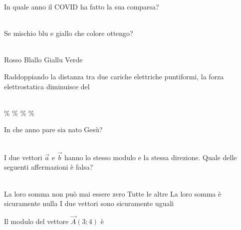\documentclass[a4paper,11pt]{exam}
\begin{document}
    
    \newpage
    
    

        \begin{center} 
        \end{center}
\begin{questions}

    
\question In quale anno il COVID ha fatto la sua comparsa?\\\
\begin{oneparchoices}
\end{oneparchoices}

    
\question Se mischio blu e giallo che colore ottengo?\\\
\begin{oneparchoices}
  \choice Rosso
  \choice Blallo
  \choice Giallu
  \choice Verde
\end{oneparchoices}

    
\question Raddoppiando la distanza tra due cariche elettriche puntiformi, la forza elettrostatica diminuisce del\\\
\begin{oneparchoices}
  \choice 90\%
  \choice 25\%
  \%
  \%
\end{oneparchoices}

    
\question In che anno pare sia nato Gesù?\\\
\begin{oneparchoices}
  19
  \choice 0
  \choice -80
  \choice 20
\end{oneparchoices}

    
\question I due vettori $\vec{a}$ e $\vec{b}$ hanno lo stesso modulo e la stessa direzione. Quale delle seguenti affermazioni è falsa?\\\
\begin{oneparchoices}
  \choice La loro somma non può mai essere zero
  \choice Tutte le altre
  \choice La loro somma è sicuramente nulla
  \choice I due vettori sono sicuramente uguali
\end{oneparchoices}

    
\question Il modulo del vettore $\vec{A}(3;4)$ è\\\
\begin{oneparchoices}
  \choice 25
  \choice 5
\end{oneparchoices}


\end{questions}
\end{document}
